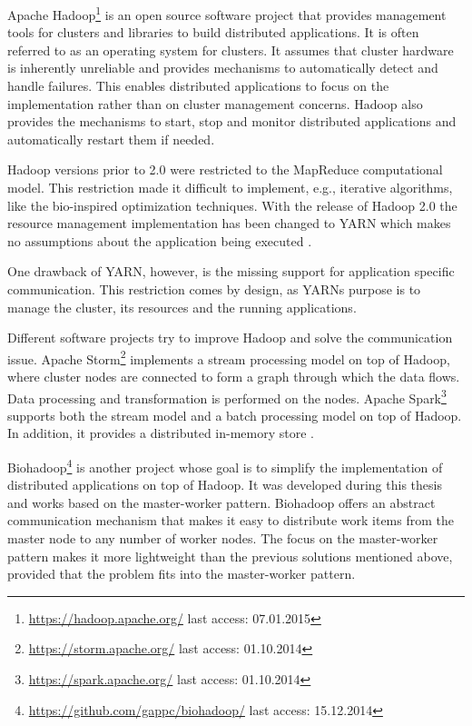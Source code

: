 Apache Hadoop\footnote{\url{https://hadoop.apache.org/} last access: 07.01.2015} is an open source software project that provides management tools for clusters and libraries to build distributed applications. It is often referred to as an operating system for clusters. It assumes that cluster hardware is inherently unreliable and provides mechanisms to automatically detect and handle failures. This enables distributed applications to focus on the implementation rather than on cluster management concerns. Hadoop also provides the mechanisms to start, stop and monitor distributed applications and automatically restart them if needed.

Hadoop versions prior to 2.0 were restricted to the MapReduce \cite{dean2008mapreduce} computational model. This restriction made it difficult to implement, e.g., iterative algorithms, like the bio-inspired optimization techniques. With the release of Hadoop 2.0 the resource management implementation has been changed to YARN \cite{vavilapalli2013apache} which makes no assumptions about the application being executed .

One drawback of YARN, however, is the missing support for application specific communication. This restriction comes by design, as YARNs purpose is to manage the cluster, its resources and the running applications.

Different software projects try to improve Hadoop and solve the communication issue. Apache Storm\footnote{\url{https://storm.apache.org/} last access: 01.10.2014} implements a stream processing model on top of Hadoop, where cluster nodes are connected to form a graph through which the data flows. Data processing and transformation is performed on the nodes. Apache Spark\footnote{\url{https://spark.apache.org/} last access: 01.10.2014} supports both the stream model and a batch processing model on top of Hadoop. In addition, it provides a distributed in-memory store \cite{zaharia2012resilient}.

Biohadoop\footnote{\url{https://github.com/gappc/biohadoop/} last access: 15.12.2014} is another project whose goal is to simplify the implementation of distributed applications on top of Hadoop. It was developed during this thesis and works based on the master-worker pattern. Biohadoop offers an abstract communication mechanism that makes it easy to distribute work items from the master node to any number of worker nodes. The focus on the master-worker pattern makes it more lightweight than the previous solutions mentioned above, provided that the problem fits into the master-worker pattern.

